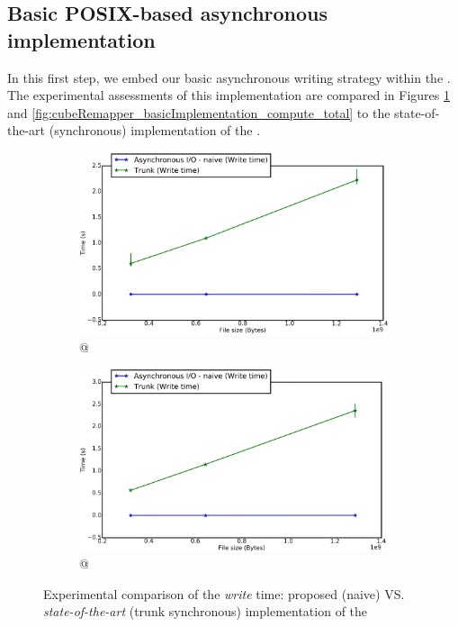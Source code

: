 	\subsection{Basic POSIX-based asynchronous implementation}
		In this first step, we embed our basic asynchronous writing strategy within the \toolTargetSoftware.   The experimental assessments of this implementation are compared in Figures \ref{fig:cubeRemapper_basicImplementation_write} and \ref{fig:cubeRemapper_basicImplementation_compute_total} to the state-of-the-art (synchronous) implementation of the \toolTargetSoftware\space.\\

			\begin{figure}[!h]
				\centering
				\begin{subfigure}[b]{0.475\textwidth}
					\centering
					\includegraphics[width=\textwidth]{charts/cubeRemapper_basicImplementation_write_workstation_8core.png}
					\caption[\targetPlatformLaptop \space @ \targetPlatformLaptopFrequency]
					{{\small \targetPlatformLaptop \space @ \targetPlatformLaptopFrequency}}
				\end{subfigure}
				\hfill
				\begin{subfigure}[b]{0.475\textwidth}
					\centering
					\includegraphics[width=\textwidth]{charts/cubeRemapper_basicImplementation_write_hpc.png}
					\caption[]%
					{{\small \targetPlatformHpc \space @ \targetPlatformHpcFrequency}}
				\end{subfigure}
				\caption{Experimental comparison of the \emph{write} time: proposed \emph{\notationaio\space} (naive) VS. \emph{state-of-the-art} (trunk synchronous) implementation of the \toolTargetSoftware}
				\label{fig:cubeRemapper_basicImplementation_write}
			\end{figure}

